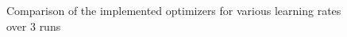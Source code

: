 \documentclass[letterpaper]{article}
\providecommand{\1}{\mathbf{1}}
\providecommand{\0}{\mathbf{0}}
\begin{document}
\begin{figure}[H]
\begin{minipage}{.45\textwidth}
        \end{minipage}
        \caption{Comparison of the implemented optimizers for various learning rates over 3 runs}
        \label{fig:optim}
    \end{figure}
\end{document}
